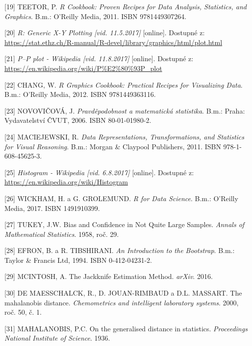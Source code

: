 \documentclass[12pt,]{article}
\begin{document}
\hypertarget{ref-teetor2011}{}
{[}19{]} TEETOR, P. \emph{R Cookbook: Proven Recipes for Data Analysis,
Statistics, and Graphics}. B.m.: O'Reilly Media, 2011. ISBN
9781449307264.

\hypertarget{ref-plot}{}
{[}20{]} \emph{R: Generic X-Y Plotting {[}vid. 11.5.2017{]}}
{[}online{]}. Dostupné z:
\url{https://stat.ethz.ch/R-manual/R-devel/library/graphics/html/plot.html}

\hypertarget{ref-pp_wiki}{}
{[}21{]} \emph{P--P plot - Wikipedia {[}vid. 11.8.2017{]}} {[}online{]}.
Dostupné z: \url{https://en.wikipedia.org/wiki/P\%E2\%80\%93P_plot}

\hypertarget{ref-chang2012}{}
{[}22{]} CHANG, W. \emph{R Graphics Cookbook: Practical Recipes for
Visualizing Data}. B.m.: O'Reilly Media, 2012. ISBN 9781449363116.

\hypertarget{ref-novovic2006}{}
{[}23{]} NOVOVIČOVÁ, J. \emph{Pravděpodobnost a matematická statistika}.
B.m.: Praha: Vydavatelství ČVUT, 2006. ISBN 80-01-01980-2.

\hypertarget{ref-datarep2011}{}
{[}24{]} MACIEJEWSKI, R. \emph{Data Representations, Transformations,
and Statistics for Visual Reasoning}. B.m.: Morgan \& Claypool
Publishers, 2011. ISBN 978-1-608-45625-3.

\hypertarget{ref-hist_wiki}{}
{[}25{]} \emph{Histogram - Wikipedia {[}vid. 6.8.2017{]}} {[}online{]}.
Dostupné z: \url{https://en.wikipedia.org/wiki/Histogram}

\hypertarget{ref-grolemund_wickham2017}{}
{[}26{]} WICKHAM, H. a G. GROLEMUND. \emph{R for Data Science}. B.m.:
O'Reilly Media, 2017. ISBN 1491910399.

\hypertarget{ref-jackknife_tukey}{}
{[}27{]} TUKEY, J.W. Bias and Confidence in Not Quite Large Samples.
\emph{Annals of Mathematical Statistics}. 1958, roč. 29.

\hypertarget{ref-bootstrap}{}
{[}28{]} EFRON, B. a R. TIBSHIRANI. \emph{An Introduction to the
Bootstrap}. B.m.: Taylor \& Francis Ltd, 1994. ISBN 0-412-04231-2.

\hypertarget{ref-mcintosh2016}{}
{[}29{]} MCINTOSH, A. The Jackknife Estimation Method. \emph{arXiv}.
2016.

\hypertarget{ref-mbdist2}{}
{[}30{]} DE MAESSCHALCK, R., D. JOUAN-RIMBAUD a D.L. MASSART. The
mahalanobis distance. \emph{Chemometrics and intelligent laboratory
systems}. 2000, roč. 50, č. 1.

\hypertarget{ref-mbdist}{}
{[}31{]} MAHALANOBIS, P.C. On the generalised distance in statistics.
\emph{Proceedings National Institute of Science}. 1936.
\end{document}
